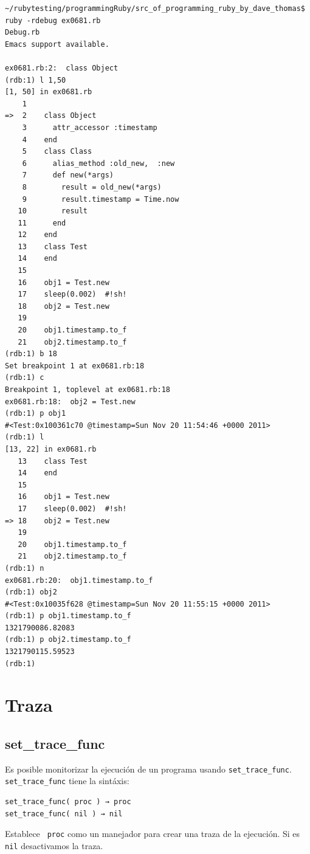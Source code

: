 \begin{verbatim}
~/rubytesting/programmingRuby/src_of_programming_ruby_by_dave_thomas$ ruby -rdebug ex0681.rb 
Debug.rb
Emacs support available.

ex0681.rb:2:  class Object
(rdb:1) l 1,50
[1, 50] in ex0681.rb
    1  
=>  2    class Object
    3      attr_accessor :timestamp
    4    end
    5    class Class
    6      alias_method :old_new,  :new
    7      def new(*args)
    8        result = old_new(*args)
    9        result.timestamp = Time.now
   10        result
   11      end
   12    end
   13    class Test
   14    end
   15    
   16    obj1 = Test.new
   17    sleep(0.002)  #!sh!
   18    obj2 = Test.new
   19  
   20    obj1.timestamp.to_f
   21    obj2.timestamp.to_f
(rdb:1) b 18
Set breakpoint 1 at ex0681.rb:18
(rdb:1) c
Breakpoint 1, toplevel at ex0681.rb:18
ex0681.rb:18:  obj2 = Test.new
(rdb:1) p obj1
#<Test:0x100361c70 @timestamp=Sun Nov 20 11:54:46 +0000 2011>
(rdb:1) l
[13, 22] in ex0681.rb
   13    class Test
   14    end
   15    
   16    obj1 = Test.new
   17    sleep(0.002)  #!sh!
=> 18    obj2 = Test.new
   19  
   20    obj1.timestamp.to_f
   21    obj2.timestamp.to_f
(rdb:1) n
ex0681.rb:20:  obj1.timestamp.to_f
(rdb:1) obj2
#<Test:0x10035f628 @timestamp=Sun Nov 20 11:55:15 +0000 2011>
(rdb:1) p obj1.timestamp.to_f
1321790086.82083
(rdb:1) p obj2.timestamp.to_f
1321790115.59523
(rdb:1) 
\end{verbatim}


\section{Traza}

\subsection{set\_trace\_func}
Es posible monitorizar la ejecución de un programa usando \verb|set_trace_func|.
\verb|set_trace_func| tiene la sintáxis:
\begin{verbatim}
set_trace_func( proc ) → proc 
set_trace_func( nil ) → nil
\end{verbatim}
Establece \verb| proc| como un manejador para crear una traza 
de la ejecución. Si es \verb|nil| desactivamos la traza.

